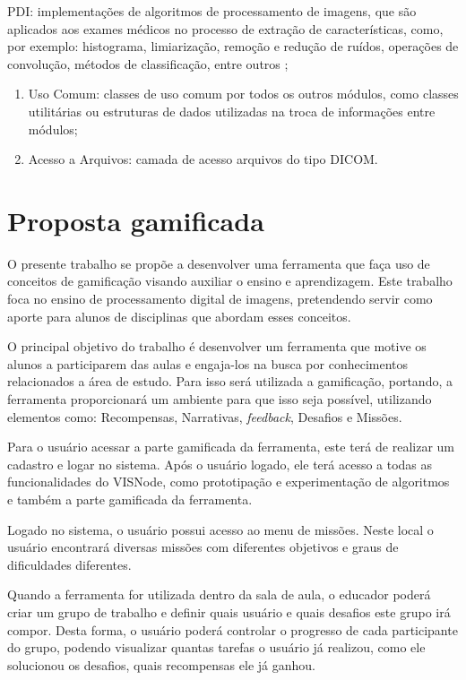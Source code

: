 \documentclass[
	12pt,				%
	oneside,			%
	a4paper,			%
	english,			%
	french,				%
	spanish,			%
	brazil,				%
	]{abntex2}
\begin{document}
PDI: implementações de algoritmos de processamento de imagens, que são aplicados aos exames médicos no processo de extração de características, como, por exemplo: histograma, limiarização, remoção e redução de ruídos, operações de convolução, métodos de classificação, entre outros \cite{reisferramenta}; 

\begin{enumerate}
\item Uso Comum: classes de uso  comum  por todos os outros módulos, como classes utilitárias ou estruturas de dados utilizadas na troca de informações entre módulos; 
\item Acesso a Arquivos: camada de acesso arquivos do tipo DICOM.
\end{enumerate}

\section{Proposta gamificada}

O presente trabalho se propõe a desenvolver uma ferramenta que faça uso de conceitos de gamificação visando auxiliar o ensino e aprendizagem. Este trabalho foca no ensino de processamento digital de imagens, pretendendo servir como aporte para alunos de disciplinas que abordam esses conceitos.

O principal objetivo do trabalho é desenvolver um ferramenta que motive os alunos a participarem das aulas e engaja-los na busca por conhecimentos relacionados a área de estudo. Para isso será utilizada a gamificação, portando, a ferramenta proporcionará um ambiente para que isso seja possível, utilizando elementos como:
Recompensas, Narrativas, \textit{feedback}, Desafios e Missões.

Para o usuário acessar a parte gamificada da ferramenta, este terá de realizar um cadastro e logar no sistema. Após o usuário logado, ele terá acesso a todas as funcionalidades do VISNode, como prototipação e experimentação de algoritmos e também a parte gamificada da ferramenta.

Logado no sistema, o usuário possui acesso ao menu de missões. Neste local o usuário encontrará diversas missões com diferentes objetivos e graus de dificuldades diferentes.	

Quando a ferramenta for utilizada dentro da sala de aula, o educador poderá criar um grupo de trabalho e definir quais usuário e quais desafios este grupo irá compor. Desta forma, o usuário poderá controlar o progresso de cada participante do grupo, podendo visualizar quantas tarefas o usuário já realizou, como ele solucionou os desafios, quais recompensas ele já ganhou.
\end{document}
